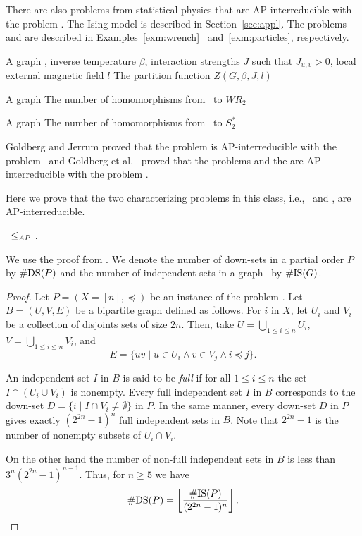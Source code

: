 There are also problems from statistical physics that are AP-interreducible with the problem \cbis\@.
The Ising model is described in Section~\ref{sec:appl}.
The problems 
and  are described in Examples~\ref{exm:wrench}~
and~\ref{exm:particles}, respectively.

{A graph \mG, inverse temperature \(\beta\), interaction strengths \(J\) such that
\(J_{u,v} > 0\), local external magnetic field \(l\)}
{The partition function \(Z(G,\beta,J,l)\)}

{A graph \mG}
{The number of homomorphisms from \mG\ to \(WR_2\)}

{A graph \mG}
{The number of homomorphisms  from \mG\ to \(S^*_2\)}

Goldberg and Jerrum \cite{Goldberg2007} proved that the problem  
is AP-interreducible with the problem \cbis\ and 
Goldberg et al.~\cite{Leslie03} proved that the problems  and
the  are  AP-interreducible with the problem \cbis\@.

Here we prove that the two characterizing problems in this class, i.e., \cbis\ and \cdsp,
are AP-interreducible.
\begin{lemma} \label{lem:dstobis}
\cdsp\ \(\le_{AP}\) \cbis\@.
\end{lemma}

We use the proof from \cite{counting}\@. We denote the number of down-sets in a partial order 
\(P\) by \(\#\mathrm{DS}(P)\) and the number of independent sets in a graph \mG\ by
\(\#\mathrm{IS}(G)\)\@.
\begin{proof}
Let \(P=(X=[n],\preceq)\) be an instance of the problem \cdsp\@. 
Let \(B=(U,V,E)\) be a bipartite graph defined as follows.
For \(i\) in \(X\), let \(U_i\) and \(V_i\) be a collection of disjoints sets of
size \(2n\)\@. Then, take \(U=\bigcup_{1 \le i \le n} U_i\), \(V=\bigcup_{1 \le i\le n} V_i\), and
\[E = \{uv \mid u \in U_i \land v \in V_j \land i \preceq j\}.\]

An independent set \(I\) in \(B\) is said to be \emph{full} if for all \(1 \le i \le n\)
the set \(I\cap (U_i \cup V_i)\) is nonempty. Every full independent set \(I\) in \(B\)
corresponds to the down-set \(D=\{i \mid I \cap V_i \neq \emptyset\}\) in \(P\)\@.
In the same manner, every down-set \(D\) in \(P\) gives exactly \((2^{2n}-1)^n\) full independent
sets in \(B\)\@. Note that \(2^{2n}-1\) is the number of nonempty subsets of \(U_i \cap V_i\)\@.

On the other hand the number of non-full independent sets in \(B\) is less than
\(3^n(2^{2n}-1)^{n-1}\)\@. Thus, for \(n\ge 5\) we have 
\[\#\mathrm{DS}(P) = \left\lfloor\frac{\#\mathrm{IS}(P)}{(2^{2n}-1)^n} \right\rfloor .\]
\end{proof}

